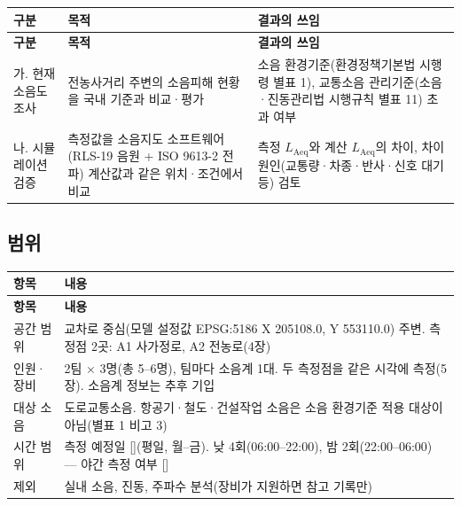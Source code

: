 \documentclass[10.5pt,a4paper]{article}
\newcommand{\Laeq}{\ensuremath{L_{\mathrm{Aeq}}}}
\newcommand{\IN}{[\quad]}
\newcommand{\hd}[1]{\cellcolor{headfill}\textbf{\sffamily #1}}
\begin{document}
\begin{longtable}{>{\raggedright\arraybackslash}p{}>{\raggedright\arraybackslash}p{}>{\raggedright\arraybackslash}p{}}
\toprule
\hd{구분} & \hd{목적} & \hd{결과의 쓰임} \\ \midrule
\endfirsthead
\toprule
\hd{구분} & \hd{목적} & \hd{결과의 쓰임} \\ \midrule
\endhead
\bottomrule
\endlastfoot
가. 현재 소음도 조사 & 전농사거리 주변의 소음피해 현황을 국내 기준과 비교·평가 & 소음 환경기준(환경정책기본법 시행령 별표 1), 교통소음 관리기준(소음·진동관리법 시행규칙 별표 11) 초과 여부 \\ \midrule
나. 시뮬레이션 검증 & 측정값을 소음지도 소프트웨어(RLS-19 음원 + ISO 9613-2 전파) 계산값과 같은 위치·조건에서 비교 & 측정 \Laeq{}와 계산 \Laeq{}의 차이, 차이 원인(교통량·차종·반사·신호 대기 등) 검토 \\
\end{longtable}
\addtocounter{table}{-1}
\normalsize
{}\subsection{범위}
\small
\begin{longtable}{>{\raggedright\arraybackslash}p{}>{\raggedright\arraybackslash}p{}}
\toprule
\hd{항목} & \hd{내용} \\ \midrule
\endfirsthead
\toprule
\hd{항목} & \hd{내용} \\ \midrule
\endhead
\bottomrule
\endlastfoot
공간 범위 & 교차로 중심(모델 설정값 EPSG:5186 X 205108.0, Y 553110.0) 주변. 측정점 2곳: A1 사가정로, A2 전농로(4장) \\ \midrule
인원·장비 & 2팀 $\times$ 3명(총 5--6명), 팀마다 소음계 1대. 두 측정점을 같은 시각에 측정(5장). 소음계 정보는 추후 기입 \\ \midrule
대상 소음 & 도로교통소음. 항공기·철도·건설작업 소음은 소음 환경기준 적용 대상이 아님(별표 1 비고 3) \\ \midrule
시간 범위 & 측정 예정일 \IN(평일, 월--금). 낮 4회(06:00--22:00), 밤 2회(22:00--06:00) --- 야간 측정 여부 \IN \\ \midrule
제외 & 실내 소음, 진동, 주파수 분석(장비가 지원하면 참고 기록만) \\
\end{longtable}
\addtocounter{table}{-1}
\normalsize
\end{document}
